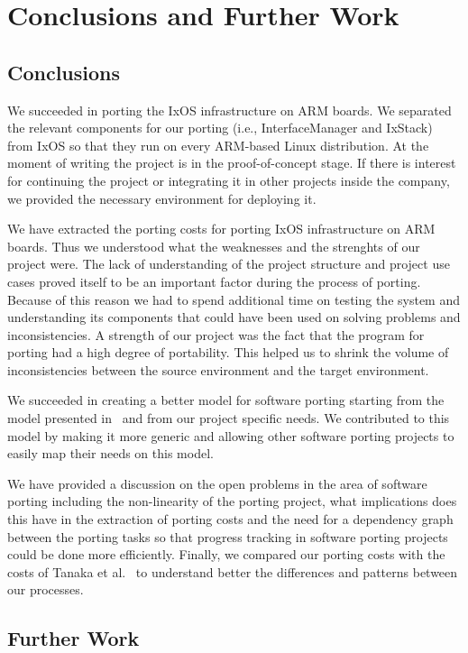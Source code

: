 \section{Conclusions and Further Work}

\subsection{Conclusions}
We succeeded in porting the IxOS infrastructure on ARM boards. We separated the
relevant components for our porting (i.e., InterfaceManager and IxStack) from
IxOS so that they run on every ARM-based Linux distribution. At the moment of
writing the project is in the proof-of-concept stage. If there is interest for
continuing the project or integrating it in other projects inside the company,
we provided the necessary environment for deploying it.

We have extracted the porting costs for porting IxOS infrastructure on ARM
boards. Thus we understood what the weaknesses and the strenghts of our project
were. The lack of understanding of the project structure and project use cases
proved itself to be an important factor during the process of porting. Because
of this reason we had to spend additional time on testing the system and
understanding its components that could have been used on solving problems and
inconsistencies. A strength of our project was the fact that the program for
porting had a high degree of portability. This helped us to shrink the volume of
inconsistencies between the source environment and the target environment.

We succeeded in creating a better model for software porting starting from the
model presented in~\cite{b1,b2} and from our project specific needs. We
contributed to this model by making it more generic and allowing other software
porting projects to easily map their needs on this model.

We have provided a discussion on the open problems in the area of software
porting including the non-linearity of the porting project, what implications
does this have in the extraction of porting costs and the need for a dependency
graph between the porting tasks so that progress tracking in software porting
projects could be done more efficiently. Finally, we compared our porting costs
with the costs of Tanaka et al.~\cite{b1} to understand better the differences
and patterns between our processes. 

\subsection{Further Work}

